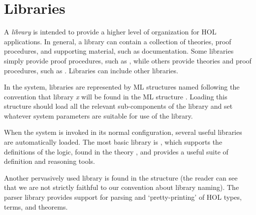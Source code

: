 \chapter{Libraries}\label{HOLlibraries}

%


\newcommand{\simpset}{simpset}
\newcommand{\Simpset}{Simpset}

{
 \newcommand{\term}      {\mbox{\it term}}
 \newcommand{\IMP}       {\mbox{\tt ==>}}
 \newcommand{\ALL}       {\mbox{\tt !}}
 \newcommand{\EXISTS}    {\mbox{\tt ?}}
 \newcommand{\CHOOSE}    {\mbox{\tt @}}
 \newcommand{\EXISTSONE} {\mbox{\tt ?!}}
 \newcommand{\LET}       {\mbox{\tt let}}
 \newcommand{\und}       {\mbox{\tt and}}
 \newcommand{\IN}        {\mbox{\tt in}}
 \newcommand{\CONS}      {\mbox{\tt CONS}}
 \newcommand{\SUC}       {\mbox{\tt SUC}}
 \newcommand{\vstr}      {\mbox{\it vstr}}

A \emph{library} is intended to provide a higher level of
organization for HOL applications. In general, a library
can contain a collection of theories, proof procedures,
and supporting material, such as documentation. Some libraries
simply provide proof procedures, such as ,
while others provide theories and proof procedures, such as
. Libraries can include other libraries.

In the \HOL{} system, libraries are represented by ML structures named
following the convention that library \emph{x} will be found in the ML
structure . Loading this structure should load all
the relevant sub-components of the library and set whatever system
parameters are suitable for use of the library.

When the \HOL{} system is invoked in its normal configuration, several
useful libraries are automatically loaded. The most basic \HOL{}
library is , which supports the definitions of
the \HOL{} logic, found in the theory , and provides a
useful suite of definition and reasoning tools.

Another pervasively used library is found in the structure
 (the reader can see that we are not strictly
faithful to our convention about library naming). The parser library
provides support for parsing and `pretty-printing' of HOL types,
terms, and theorems.

}
